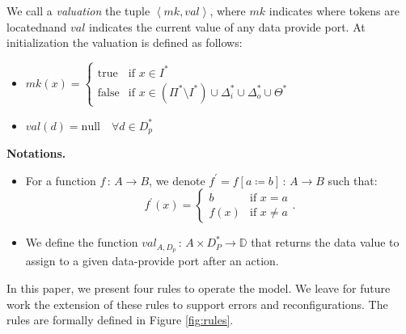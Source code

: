 We call a \emph{valuation} the tuple $\left\langle mk,val\right\rangle$,
where $mk$ indicates where tokens are locatednand $val$ indicates the
current value of any data provide port.
At initialization the valuation is defined as follows:
\begin{itemize}
\item $mk\left(x\right)=\begin{cases}
\text{true} & \text{if }x\in I^{*}\\
\text{false} & \text{if } x\in\left(\Pi^{*}\setminus I^*\right)\cup\Delta_{i}^{*}\cup\Delta_{o}^{*}\cup\Theta^{*}
\end{cases}$
\item $val\left(d\right)=\text{null}\quad\forall d \in D^*_{p}$
\end{itemize}

\noindent\textbf{Notations.}
\begin{itemize}
  \item For a function $f\,:\,A\rightarrow B$, we denote $f^{\prime}=f\left[a\coloneqq b\right]\,:\,A\rightarrow B$ such that:
    \begin{equation*}
      f^{\prime}\left(x\right)=\begin{cases}
      b & \text{if }x=a\\
      f\left(x\right) & \text{if }x\neq a
      \end{cases}.
    \end{equation*}
  \item We define the function $val_{A,D_p}\,:\,A\times
    D_{P}^*\rightarrow \mathbb{D}$ that returns the data value to assign to a
    given data-provide port after an action.
\end{itemize}
    
In this paper, we present four rules to operate the \mad model. We
leave for future work the extension of these rules to support errors
and reconfigurations. The rules are formally defined in
Figure \ref{fig:rules}.

